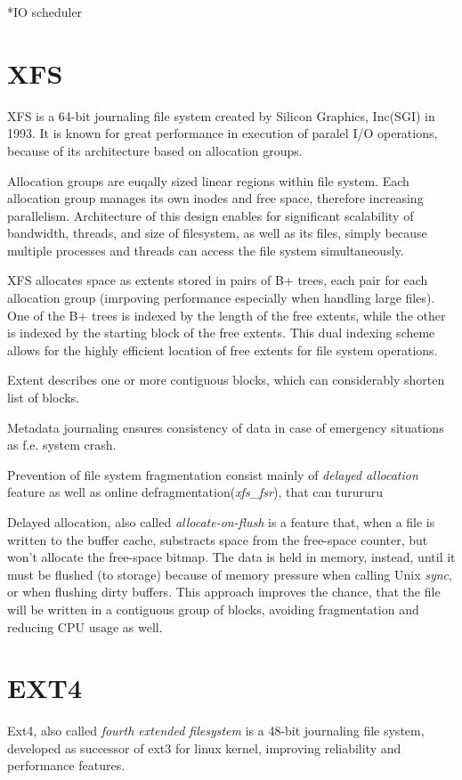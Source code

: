 \documentclass[
  color, %
  table, %
  lof,   %
  lot,   %
]{fithesis3}
\begin{document}
*IO scheduler
\section{XFS}
XFS is a 64-bit journaling file system created by Silicon Graphics, Inc(SGI) in 1993. It is known for great performance in execution of paralel I/O operations, because of its architecture based on allocation groups.

Allocation groups are euqally sized linear regions within file system. Each allocation group manages its own inodes and free space, therefore increasing parallelism.
Architecture of this design enables for significant scalability of bandwidth, threads, and size of filesystem, as well as its files, simply because multiple processes and threads can access the file system simultaneously.

XFS allocates space as extents stored in pairs of B+ trees, each pair for each allocation group (imrpoving performance especially when handling large files). One of the B+ trees is indexed by the length of the free extents, while the other is indexed by the starting block of the free extents. This dual indexing scheme allows for the highly efficient location of free extents for file system operations.

Extent describes one or more contiguous blocks, which can considerably shorten list of blocks.
 
Metadata journaling ensures consistency of data in case of emergency situations as f.e. system crash.

Prevention of file system fragmentation consist mainly of \textit{delayed allocation} feature as well as online defragmentation(\textit{xfs\_fsr}), that can turururu

Delayed allocation, also called \textit{allocate-on-flush} is a feature that, when a file is written to the buffer cache, substracts space from the free-space counter, but won't allocate the free-space bitmap. The data is held in memory, instead, until it must be flushed (to storage) because of memory pressure when calling Unix \textit{sync}, or when flushing dirty buffers. This approach improves the chance, that the file will be written in a contiguous group of blocks, avoiding fragmentation and reducing CPU usage as well.

\section{EXT4}
Ext4, also called \textit{fourth extended filesystem} is a 48-bit journaling file system, developed as successor of ext3 for linux kernel, improving reliability and performance features.
\end{document}
